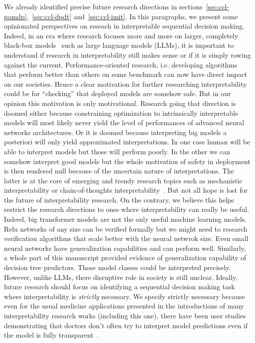 We already identified precise future research directions in sections~\ref{sec:ccl-pomdp},~\ref{sec:ccl-dpdt} and~\ref{sec:ccl-imit}. 
In this paragraphs, we present some opinionated perspectives on reseach in interpretable sequential decision making.
Indeed, in an era where research focuses more and more on larger, completely black-box models~\cite{all-you-need} such as large language models (LLMs), it is important to understand if research in interpretability still makes sense or if it is simply rowing against the current.
Performance-oriented research, i.e. developing algorithms that perform better than others on some benchmark can now have direct impact on our societies.
Hence a clear motivation for further researching interpretability could be for ``checking'' that deployed models are somehow safe.
But in our opinion this motivation is only motivational.
Research going that direction is doomed either because constraining optimization to intrinsically interpretable models will most likely never yield the level of performances of advanced neural networks architectures.
Or it is doomed because interpreting big models a posteriori will only yield approximated interpretations.
In one case human will be able to interpret models but those will perform poorly. 
In the other we can somehow interpret good models but the whole motivation of safety in deployment is then rendered null because of the uncertain nature of interpretations.
The latter is at the core of emerging and trendy research topics such as mechanistic interpretability or chain-of-thoughts interpretability~\cite{barez-chain-2025}.
But not all hope is lost for the future of interpretability research.
On the contrary, we believe this helps restrict the research directions to ones where interpretability can really be useful.
Indeed, big transformer models are not the only useful machine learning models.
Relu networks of any size can be verified formally but we might need to research verification algorithms that scale better with the neural netwrok size.
Even small neural networks have generalization capabilities and can perform well.
Similarly, a whole part of this manuscript provided evidence of generalization capability of decision tree predictors.
Those model classes could be interpreted precisely.
However, unlike LLMs, there disruptive role in society is still unclear.
Ideally, future research should focus on identifying a sequential decision making task where interpretability is \textit{strictly} necessary.
We specify strictly necessary because even for the usual medicine applications presented in the introductions of many interpretability research works (including this one), there have been user studies demonstrating that doctors don't often try to interpret model predictions even if the model is fully transparent~\cite{festor}.
